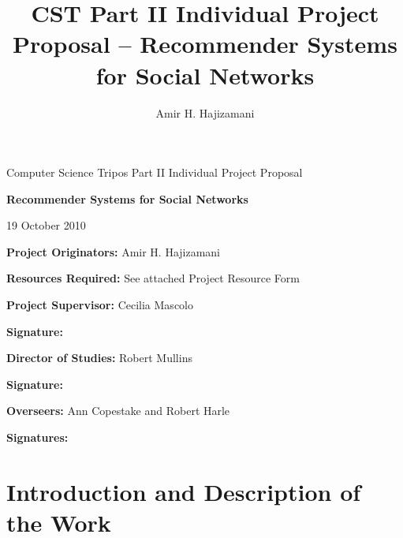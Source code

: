 
\author{Amir H. Hajizamani}
\title{CST Part II Individual Project Proposal -- Recommender Systems for Social Networks}


\newcommand{\al}{$<$}
\newcommand{\ar}{$>$}

\parindent 0pt
\parskip 6pt

\thispagestyle{empty}

\medskip
{}
\medskip
{}

\vfill

\centerline{\large Computer Science Tripos Part II Individual Project Proposal}
\vspace{0.4in}
\centerline{\Large\bf Recommender Systems for Social Networks}
\vspace{0.3in}
\centerline{\large{19 October 2010}}

\vfill

{\bf Project Originators:} Amir H. Hajizamani

\vspace{0.1in}

{\bf Resources Required:} See attached Project Resource Form

\vspace{0.5in}

{\bf Project Supervisor:} Cecilia Mascolo

\vspace{0.2in}

{\bf Signature:}

\vspace{0.5in}

{\bf Director of Studies:} Robert Mullins

\vspace{0.2in}

{\bf Signature:}

\vspace{0.5in}

{\bf Overseers:} Ann Copestake and Robert Harle

\vspace{0.2in}

{\bf Signatures:}

\vfill
\eject


\section{Introduction and Description of the Work}

